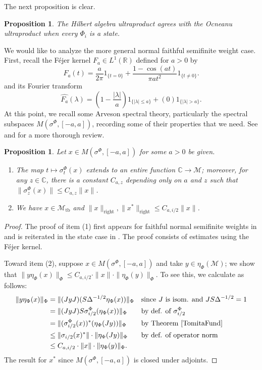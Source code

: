 \documentclass[12pt]{amsart}
\newtheorem{prop}[thm]{Proposition}
\theoremstyle{definition}
\def\cal{\mathcal}
\def \tb{\operatorname{tb}}
\def \rt{\operatorname{right}}
\def \bbR{\mathbb{R}}
\begin{document}
The next proposition is clear.

\begin{prop}\label{HAandOcStates}
    The Hilbert algebra ultraproduct agrees with the Ocneanu ultraproduct when every $\Phi_i$ is a state.
\end{prop}

We would like to analyze the more general normal faithful semifinite weight case.  First, recall the F\'ejer kernel $F_{a} \in L^1(\bbR)$ defined for $a > 0$ by
\[
F_a(t)= \frac{a}{2\pi}1_{\{t=0\}}+\frac{1-\cos(at)}{\pi a t^2}1_{\{t\not=0\}}.
\]
and its Fourier transform 
\[
\widehat{F_a}(\lambda)= \left(1 - \frac{|\lambda|}{a}\right) 1_{\{|\lambda| \leq a\}} + (0) 1_{\{|\lambda| > a\}}.
\]
At this point, we recall some Arveson spectral theory, particularly the spectral subspaces $M(\sigma^\Phi,[-a,a])$, recording some of their properties that we need. See \cite{AH} and \cite[Chapter XI]{Takesaki} for a more thorough review.

\begin{prop}\label{modularsubspaces} Let $x \in M(\sigma^\Phi,[-a,a])$ for some $a > 0$ be given.
\begin{enumerate}
    \item The map $t\mapsto \sigma^\Phi_t(x)$ extends to an entire function $\mathbb{C}\to \cal M$; moreover, for any $z\in \mathbb{C}$, there is a constant $C_{a,z}$ depending only on $a$ and $z$ such that $\|\sigma^\Phi_z(x)\|\leq C_{a,z}\|x\|$.
    \item We have $x\in \cal M_{\tb}$ and $\|x\|_{\rt},\|x^*\|_{\rt}\leq C_{a,i/2}\|x\|$.
\end{enumerate}
\end{prop}

\begin{proof}
The proof of item (1) first appears for faithful normal semifinite weights in \cite[Lemma 4.2]{Ha79} and is reiterated in the state case in \cite[Lemma 4.13]{AH}.  The proof consists of estimates using the F\'ejer kernel.

Toward item (2), suppose $x \in M(\sigma^\Phi,[-a,a])$ and take $y \in \eta_{\Phi}(\cal M)$; we show that $\|y\eta_{\Phi}(x)\|_{\Phi} \leq C_{a,i/2} \cdot \|x\| \cdot \|\eta_{\Phi}(y)\|_{\Phi}$.  To see this, we calculate as follows:
\begin{align}
\|y\eta_{\Phi}(x)\|_{\Phi} &= \|(JyJ)(S\Delta^{-1/2}\eta_{\Phi}(x))\|_{\Phi} \nonumber && \text{since $J$ is isom. and $JS\Delta^{-1/2} = 1$} \\ \nonumber
            &=\|(JyJ)S\sigma^\Phi_{i/2}(\eta_{\Phi}(x))\|_{\Phi} && \text{by def. of $\sigma^\Phi_{i/2}$} \\ \nonumber
            &= \|(\sigma^\Phi_{i/2}(x))^*(\eta_{\Phi}(Jy))\|_{\Phi} && \text{by Theorem \ref{TomitaFund}}\\ \nonumber
            &\leq \|\sigma_{i/2}(x)^*\|\cdot \|\eta_{\Phi}(Jy)\|_{\Phi} && \text{by def. of operator norm}\\ \nonumber
            &\leq C_{a,i/2}\cdot \|x\| \cdot \|\eta_{\Phi}(y)\|_{\Phi}.  \nonumber
\end{align}
The result for $x^*$ since $M(\sigma^\Phi,[-a,a])$ is closed under adjoints.
\end{proof}
\end{document}
